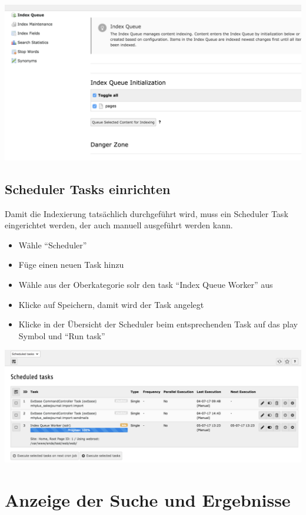 \documentclass[]{book}
\providecommand{\tightlist}{%
  \setlength{\itemsep}{0pt}\setlength{\parskip}{0pt}}
\begin{document}
\includegraphics{images/queue.png}

\section{Scheduler Tasks einrichten}

Damit die Indexierung tatsächlich durchgeführt wird, muss ein Scheduler
Task eingerichtet werden, der auch manuell ausgeführt werden kann.

\begin{itemize}
\tightlist
\item
  Wähle ``Scheduler''
\item
  Füge einen neuen Task hinzu
\item
  Wähle aus der Oberkategorie solr den task ``Index Queue Worker'' aus
\item
  Klicke auf Speichern, damit wird der Task angelegt
\item
  Klicke in der Übersicht der Scheduler beim entsprechenden Task auf das
  play Symbol und ``Run task''
\end{itemize}

\includegraphics{images/scheduler.png}

\chapter{Anzeige der Suche und Ergebnisse}
\end{document}
